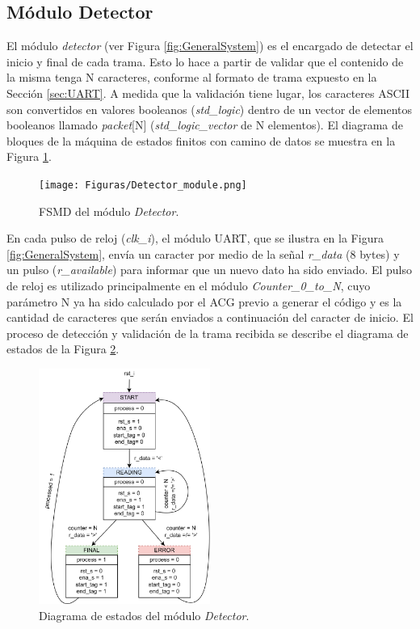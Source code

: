 \subsection{Módulo Detector}
	\label{sec:detector}
	
	El módulo \textit{detector} (ver Figura \ref{fig:GeneralSystem}) es el encargado de detectar el inicio y final de cada trama. Esto lo hace a partir de validar que el contenido de la misma tenga N caracteres, conforme al formato de trama expuesto en la Sección \ref{sec:UART}. A medida que la validación tiene lugar, los caracteres ASCII son convertidos en valores booleanos (\textit{std\_logic}) dentro de un vector de elementos booleanos llamado \textit{packet}[N] (\textit{std\_logic\_vector} de N elementos). El diagrama de bloques de la máquina de estados finitos con camino de datos se muestra en la Figura \ref{fig:Detector_module}.
	
	\begin{figure}[H]
		\centering
		\texttt{[image: Figuras/Detector\_module.png]}
		\centering\caption{FSMD del módulo \textit{Detector}.}
		\label{fig:Detector_module}
	\end{figure}
	
	En cada pulso de reloj (\textit{clk\_i}), el módulo UART, que se ilustra en la Figura \ref{fig:GeneralSystem}, envía un caracter por medio de la señal \textit{r\_data} (8 bytes) y un pulso (\textit{r\_available}) para informar que un nuevo dato ha sido enviado. El pulso de reloj es utilizado principalmente en el módulo \textit{Counter\_0\_to\_N}, cuyo parámetro N ya ha sido calculado por el ACG previo a generar el código y es la cantidad de caracteres que serán enviados a continuación del caracter de inicio. El proceso de detección y validación de la trama recibida se describe el diagrama de estados de la Figura \ref{fig:Detector_FSMD}.
	
	\begin{figure}[H]
		\centering
		\includegraphics[width=0.5\textwidth]{Figuras/Detector_FSMD.png}
		\centering\caption{Diagrama de estados del módulo \textit{Detector}.}
		\label{fig:Detector_FSMD}
	\end{figure}
	
